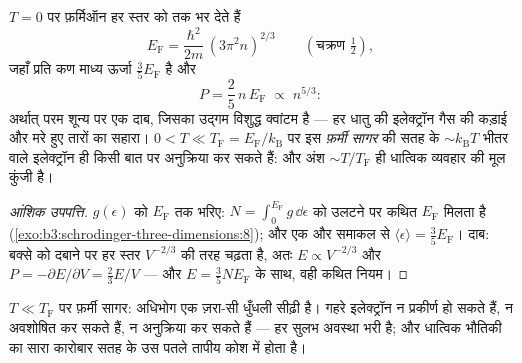 \begin{theorem}[अपह्रासित फ़र्मी गैस]\label{thm:b3:quantum-statistics:fermi}
$T = 0$ पर फ़र्मिऑन हर स्तर को \emph{} तक भर देते हैं
\[
E_{\text{F}} = \frac{\hbar^2}{2m}\,(3\pi^2n)^{2/3}
\qquad (\text{चक्रण } \tfrac12) ,
\]
जहाँ प्रति कण माध्य ऊर्जा $\tfrac35 E_{\text{F}}$ है और
\emph{}
\[
P = \frac25\,n\,E_{\text{F}} \;\propto\; n^{5/3} :
\]
अर्थात् परम शून्य पर एक दाब, जिसका उद्गम विशुद्ध क्वांटम है --- हर
धातु की इलेक्ट्रॉन गैस की कड़ाई और मरे हुए तारों का सहारा।
$0 < T \ll T_{\text{F}} = E_{\text{F}}/k_{\text{B}}$ पर
इस \emph{फ़र्मी सागर} की सतह के $\sim k_{\text{B}}T$ भीतर वाले
इलेक्ट्रॉन ही किसी बात पर अनुक्रिया कर सकते हैं: और अंश
$\sim T/T_{\text{F}}$ ही धात्विक व्यवहार की मूल कुंजी है।
\end{theorem}

\begin{proof}[आंशिक उपपत्ति]
$g(\epsilon)$ को $E_{\text{F}}$ तक भरिए: $N = \int_0^{
E_{\text{F}}}g\,\dd\epsilon$ को उलटने पर कथित $E_{\text{F}}$ मिलता है
(\cref{exo:b3:schrodinger-three-dimensions:8}); और एक और समाकल से
$\langle\epsilon
\rangle = \tfrac35 E_{\text{F}}$। दाब: बक्से को दबाने पर हर स्तर
$V^{-2/3}$ की तरह चढ़ता है, अतः $E
\propto V^{-2/3}$ और $P = -\partial E/\partial V = \tfrac23 E/V$
--- और $E = \tfrac35 NE_{\text{F}}$ के साथ, वही कथित नियम।
\end{proof}

\begin{omfigure}

{\small $T \ll T_{\text{F}}$ पर फ़र्मी सागर: अधिभोग एक
ज़रा-सी धुँधली सीढ़ी है। गहरे इलेक्ट्रॉन न प्रकीर्ण हो सकते हैं, न
अवशोषित कर सकते हैं, न अनुक्रिया कर सकते हैं --- हर सुलभ अवस्था भरी
है; और धात्विक भौतिकी का सारा कारोबार सतह के उस पतले तापीय कोश में
होता है।}
\end{omfigure}

